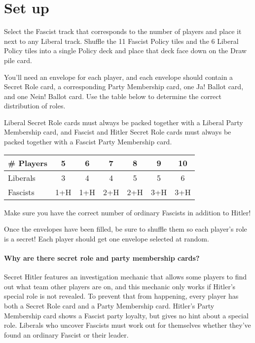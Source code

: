\documentclass[13pt,a4paper,twocolumn,titlepage]{scrartcl}
\begin{document}
	\section*{Set up}
	Select the \textcolor{fascist}{Fascist} track that corresponds to the number of players and place it next to any \textcolor{liberal}{Liberal} track. Shuffle the 11 \textcolor{fascist}{Fascist} Policy tiles and the 6 \textcolor{liberal}{Liberal} Policy tiles into a single Policy deck and place that deck face down on the Draw pile card.
	
	You’ll need an envelope for each player, and each envelope should contain a Secret Role card, a corresponding Party Membership card, one Ja! Ballot card, and one Nein! Ballot card. Use the table below to determine the correct distribution of roles.
	
	\textcolor{liberal}{Liberal} Secret Role cards must always be packed together with a \textcolor{liberal}{Liberal} Party Membership card, and \textcolor{fascist}{Fascist} and \textcolor{fascist}{Hitler} Secret Role cards must always be packed together with a \textcolor{fascist}{Fascist} Party Membership card.	
	\begin{center}
		\begin{tabular}{l|c|c|c|c|c|c}
			\# Players & 5 & 6 & 7 & 8 & 9 & 10\\
			\hline
			\textcolor{liberal}{Liberals} & 3 & 4 & 4 & 5 & 5 & 6\\
			\hline
			\textcolor{fascist}{Fascists} & 1+H & 1+H & 2+H & 2+H & 3+H & 3+H\\	
		\end{tabular}
	\end{center}
	
	Make sure you have the correct number of ordinary \textcolor{fascist}{Fascists} in addition to \textcolor{fascist}{Hitler}!
	
	Once the envelopes have been filled, be sure to shuffle them so each player’s role is a secret! Each player should get one envelope selected at random.
	
	\vspace*{-8mm}
	\paragraph{\textcolor{SeaGreen4}{Why are there secret role and party membership cards?}}
	\textcolor{SeaGreen4}{Secret Hitler features an investigation mechanic that allows some players to find out what team other players are on, and this mechanic only works if Hitler’s special role is not revealed. To prevent that from happening, every player has both a Secret Role card and a Party Membership card. Hitler’s Party Membership card shows a Fascist party loyalty, but gives no hint about a special role. Liberals who uncover Fascists must work out for themselves whether they’ve found an ordinary Fascist or their leader.}
	
\end{document}
